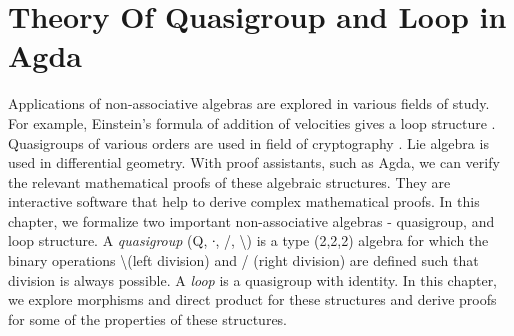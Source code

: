 \chapter{Theory Of Quasigroup and Loop in Agda}
Applications of non-associative algebras are explored in various fields of
study. For example, Einstein's formula of addition of velocities gives a loop
structure \cite{ungar2007einstein}. Quasigroups of various orders are used in
field of cryptography \cite{phillips2010automated}. Lie algebra is used in
differential geometry\cite{quasigroupWiki}. With proof assistants, such as Agda,
we can verify the relevant mathematical proofs of these algebraic structures.
They are interactive software that help to derive complex mathematical proofs.
In this chapter, we formalize two important non-associative algebras -
quasigroup, and loop structure. A \textit{quasigroup} (Q, ∙, /, \textbackslash)
is a type (2,2,2) algebra for which the binary operations \textbackslash (left
division) and / (right division) are defined such that division is always
possible.  A \textit{loop} is a quasigroup with identity. In this chapter, we
explore morphisms and direct product for these structures and derive proofs for
some of the properties of these structures.
